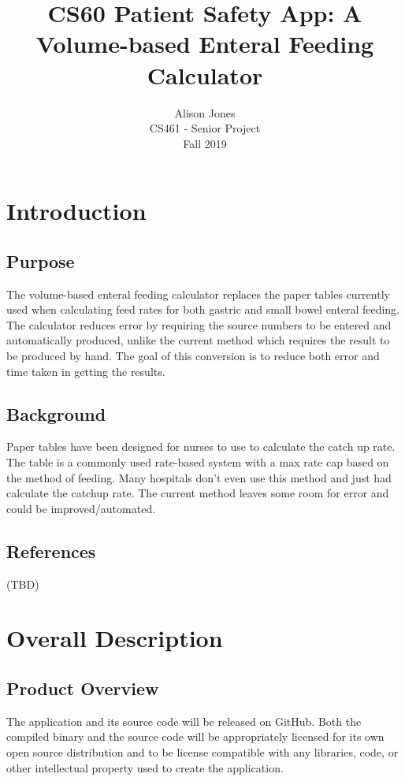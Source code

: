 \documentclass[fullpage,10pt, onecolumn, draftclsnofoot]{IEEEtran}
\title{CS60 Patient Safety App: A Volume-based Enteral Feeding Calculator}
\author{Alison Jones\\ CS461 - Senior Project \\Fall 2019}
\begin{document}
\maketitle


\section{Introduction}

\subsection{Purpose}
The volume-based enteral feeding calculator replaces the paper tables currently used when 
calculating feed rates for both gastric and small bowel enteral feeding. The calculator reduces
error by requiring the source numbers to be entered and automatically produced, unlike the current
method which requires the result to be produced by hand. The goal of this conversion is to reduce both
error and time taken in getting the results.

\subsection{Background}
Paper tables have been designed for nurses to use to calculate the catch up rate. The table is a commonly used rate-based system with a max rate cap based on the method of feeding. Many hospitals don't even use this method and just had calculate the catchup rate. The current method leaves some room for error and could be improved/automated.

\subsection{References}
(TBD)

\section{Overall Description}
\subsection{Product Overview}
The application and its source code will be released on GitHub. Both the compiled binary and the source code
will be appropriately licensed for its own open source distribution and to be license compatible with any 
libraries, code, or other intellectual property used to create the application.
\end{document}
